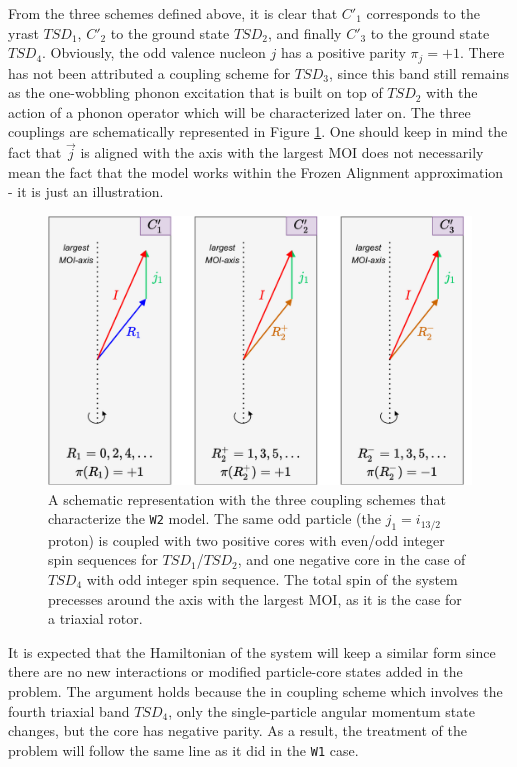 \documentclass[11pt]{article}
\begin{document}
From the three schemes defined above, it is clear that $C'_1$ corresponds to the yrast $TSD_1$, $C'_2$ to the ground state $TSD_2$, and finally $C'_3$ to the ground state $TSD_4$. Obviously, the odd valence nucleon $j$ has a positive parity $\pi_{j}=+1$. There has not been attributed a coupling scheme for $TSD_3$, since this band still remains as the one-wobbling phonon excitation that is built on top of $TSD_2$ with the action of a phonon operator which will be characterized later on. The three couplings are schematically represented in Figure \ref{three-couplings}. One should keep in mind the fact that $\vec{j}$ is aligned with the axis with the largest MOI does not necessarily mean the fact that the model works within the Frozen Alignment approximation - it is just an illustration.

\begin{figure}
    \centering
    \includegraphics[scale=0.65]{figs/coupling_schemes_C1C2C3.pdf}
    \caption{A schematic representation with the three coupling schemes that characterize the \texttt{W2} model. The same odd particle (the $j_1=i_{13/2}$ proton) is coupled with two positive cores with even/odd integer spin sequences for $TSD_1$/$TSD_2$, and one negative core in the case of $TSD_4$ with odd integer spin sequence. The total spin of the system precesses around the axis with the largest MOI, as it is the case for a triaxial rotor.}
    \label{three-couplings}
\end{figure}

It is expected that the Hamiltonian of the system will keep a similar form since there are no new interactions or modified particle-core states added in the problem. The argument holds because the in coupling scheme which involves the fourth triaxial band $TSD_4$, only the single-particle angular momentum state changes, but the core has negative parity. As a result, the treatment of the problem will follow the same line as it did in the \texttt{W1} case.
\end{document}
